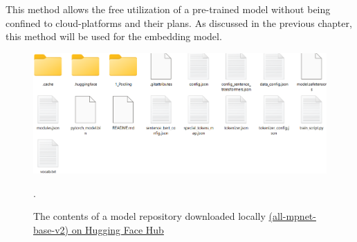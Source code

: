 This method allows the free utilization of a pre-trained model without being confined to cloud-platforms and their plans. As discussed in the previous chapter, this method will be used for the embedding model.
\begin{figure}[htbp]
    \centering
    \includegraphics[width=\linewidth]{./figures/mpnet-local-files.png}
    \caption{The contents of a model repository downloaded locally \href{https://huggingface.co/sentence-transformers/all-mpnet-base-v2}{(all-mpnet-base-v2) on Hugging Face Hub}}.
\end{figure}\newline

